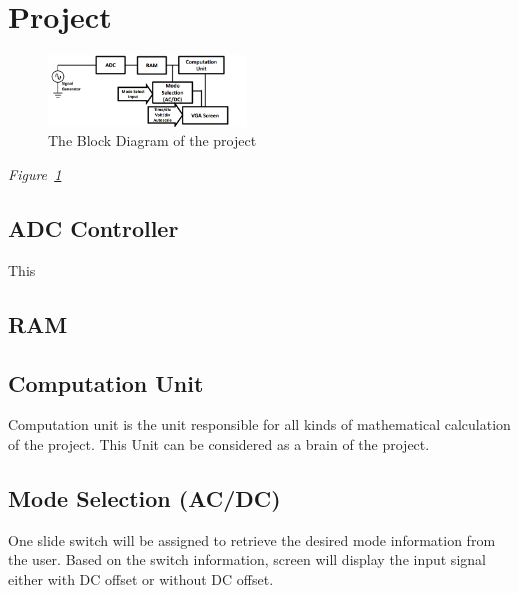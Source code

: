 \section{Project}
\- \indent


\begin{figure}[h!]
	\setlength{\unitlength}{\textwidth}
	\center 
	\includegraphics[width=0.47\textwidth]{block_diagram}
	\caption{\label{fig:block_diagram}The Block Diagram of the project}
\end{figure}

	 \textit{Figure~\ref{fig:block_diagram}}    

	

\subsection{ADC Controller} \- \indent
	This 

\subsection{RAM} \- \indent

\subsection{Computation Unit} \- \indent
	Computation unit is the unit responsible for all kinds of mathematical calculation of the project. This Unit can be considered as a brain of the project. 

\subsection{Mode Selection (AC/DC)} \- \indent
	One slide switch will be assigned to retrieve the desired mode information from the user. Based on the switch information, screen will display the input signal either with DC offset or without DC offset.

